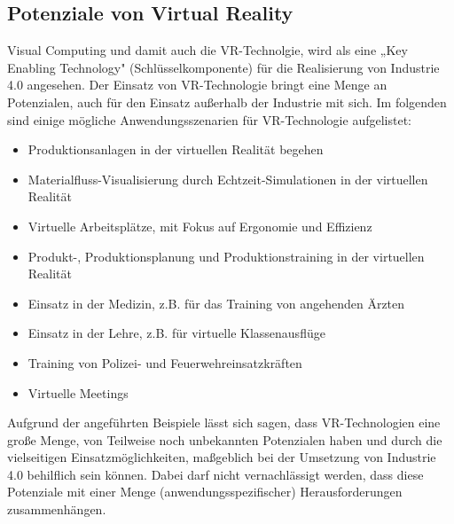 \subsection{Potenziale von Virtual Reality }\label{sec:VRPotentialUndAusblick}
Visual Computing und damit auch die VR-Technolgie, wird als eine „Key Enabling Technology" \cite[S.1]{5} (Schlüsselkomponente) für die Realisierung von Industrie 4.0 angesehen.
Der Einsatz von VR-Technologie bringt eine Menge an Potenzialen, auch für den Einsatz außerhalb der Industrie mit sich. Im folgenden sind einige mögliche Anwendungsszenarien für VR-Technologie aufgelistet:
\begin{itemize}
	\item Produktionsanlagen in der virtuellen Realität begehen \cite{33}
	\item Materialfluss-Visualisierung durch Echtzeit-Simulationen in der virtuellen Realität \cite{33}
	\item Virtuelle Arbeitsplätze, mit Fokus auf Ergonomie und Effizienz \cite{33}
	\item Produkt-, Produktionsplanung und Produktionstraining in der virtuellen Realität \cite{33}
	\item Einsatz in der Medizin, z.B. für das Training von angehenden Ärzten \cite{23}
	\item Einsatz in der Lehre, z.B. für virtuelle Klassenausflüge \cite{23}
	\item Training von Polizei- und Feuerwehreinsatzkräften \cite{23}
	\item Virtuelle Meetings \cite{23}
\end{itemize}
Aufgrund der angeführten Beispiele lässt sich sagen, dass VR-Technologien eine große Menge, von Teilweise noch unbekannten Potenzialen haben und durch die vielseitigen Einsatzmöglichkeiten, maßgeblich bei der Umsetzung von Industrie 4.0 behilflich sein können. Dabei darf nicht vernachlässigt werden, dass diese Potenziale mit einer Menge (anwendungsspezifischer) Herausforderungen zusammenhängen.

